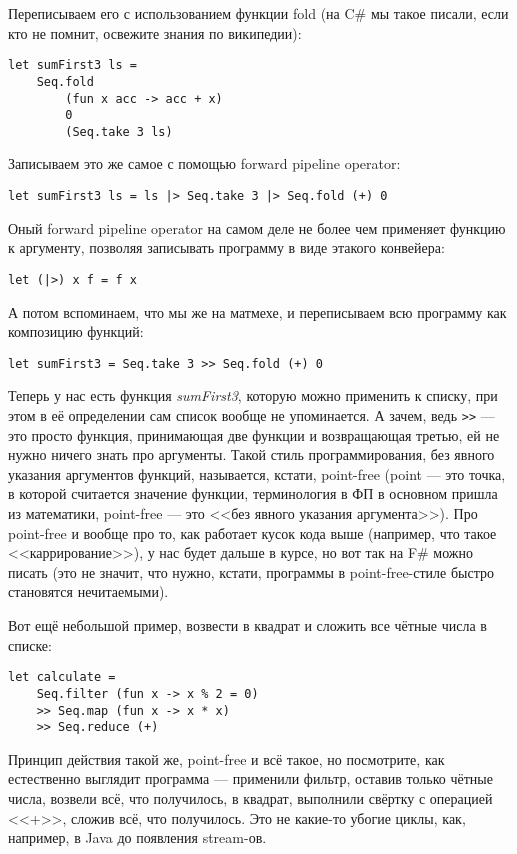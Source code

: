 \documentclass[a5paper]{article}
\begin{document}
Переписываем его с использованием функции fold (на C\# мы такое писали, если кто не помнит, освежите знания по википедии):
\begin{verbatim}
let sumFirst3 ls = 
    Seq.fold 
        (fun x acc -> acc + x) 
        0 
        (Seq.take 3 ls)
\end{verbatim}

Записываем это же самое с помощью forward pipeline operator:
\begin{verbatim}
let sumFirst3 ls = ls |> Seq.take 3 |> Seq.fold (+) 0
\end{verbatim}

Оный  forward pipeline operator на самом деле не более чем применяет функцию к аргументу, позволяя записывать программу в виде этакого конвейера:
\begin{verbatim}
let (|>) x f = f x
\end{verbatim}

А потом вспоминаем, что мы же на матмехе, и переписываем всю программу как композицию функций:
\begin{verbatim}
let sumFirst3 = Seq.take 3 >> Seq.fold (+) 0
\end{verbatim}

Теперь у нас есть функция \textit{sumFirst3}, которую можно применить к списку, при этом в её определении сам список вообще не упоминается. А зачем, ведь \verb|>>| --- это просто функция, принимающая две функции и возвращающая третью, ей не нужно ничего знать про аргументы. Такой стиль программирования, без явного указания аргументов функций, называется, кстати, point-free (point --- это точка, в которой считается значение функции, терминология в ФП в основном пришла из математики, point-free --- это <<без явного указания аргумента>>). Про point-free и вообще про то, как работает кусок кода выше (например, что такое <<каррирование>>), у нас будет дальше в курсе, но вот так на F\# можно писать (это не значит, что нужно, кстати, программы в point-free-стиле быстро становятся нечитаемыми).

Вот ещё небольшой пример, возвести в квадрат и сложить все чётные числа в списке:
\begin{verbatim}
let calculate = 
    Seq.filter (fun x -> x % 2 = 0) 
    >> Seq.map (fun x -> x * x) 
    >> Seq.reduce (+)
\end{verbatim}

Принцип действия такой же, point-free и всё такое, но посмотрите, как естественно выглядит программа --- применили фильтр, оставив только чётные числа, возвели всё, что получилось, в квадрат, выполнили свёртку с операцией <<+>>, сложив всё, что получилось. Это не какие-то убогие циклы, как, например, в Java до появления stream-ов.
\end{document}
